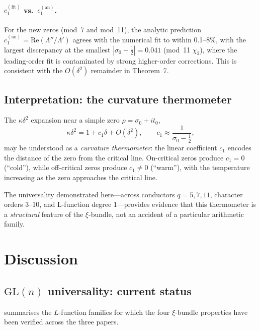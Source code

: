 \documentclass[11pt, a4paper]{article}
\theoremstyle{plain}
\theoremstyle{definition}
\newcommand{\abs}[1]{\left|#1\right|}
\newcommand{\Lam}{\Lambda}             %
\newcommand{\kap}{\kappa}             %
\begin{document}
\paragraph{$c_{1}^{(\mathrm{fit})}$ vs.\ $c_{1}^{(\mathrm{an})}$.}
For the new zeros (mod~7 and mod~11), the analytic prediction
$c_{1}^{(\mathrm{an})} = \mathrm{Re}(\Lam''/\Lam')$ agrees with the
numerical fit to within 0.1--8\%, with the largest discrepancy at the
smallest $\abs{\sigma_{0}-\tfrac{1}{2}} = 0.041$ (mod~11 $\chi_{2}$),
where the leading-order fit is contaminated by strong higher-order
corrections.  This is consistent with the $O(\delta^{2})$ remainder
in Theorem~7.


\subsection{Interpretation: the curvature thermometer}
\label{sec:thermometer}

The $\kap\delta^{2}$ expansion near a simple zero $\rho = \sigma_{0}+it_{0}$,
\[
  \kap\delta^{2} = 1 + c_{1}\delta + O(\delta^{2}),
  \qquad c_{1} \approx \frac{1}{\sigma_{0}-\tfrac{1}{2}},
\]
may be understood as a \emph{curvature thermometer}: the linear
coefficient $c_{1}$ encodes the distance of the zero from the critical
line.  On-critical zeros produce $c_{1}=0$ (``cold''), while
off-critical zeros produce $c_{1} \neq 0$ (``warm''), with the
temperature increasing as the zero approaches the critical line.

The universality demonstrated here---across conductors $q=5,7,11$,
character orders 3--10, and L-function degree 1---provides evidence
that this thermometer is a \emph{structural} feature of the
$\xi$-bundle, not an accident of a particular arithmetic family.


\section{Discussion}
\label{sec:discussion}

\subsection{$\mathrm{GL}(n)$ universality: current status}
\label{sec:universality-status}

 summarises the $L$-function families for which
the four $\xi$-bundle properties have been verified across the three
papers.
\end{document}
